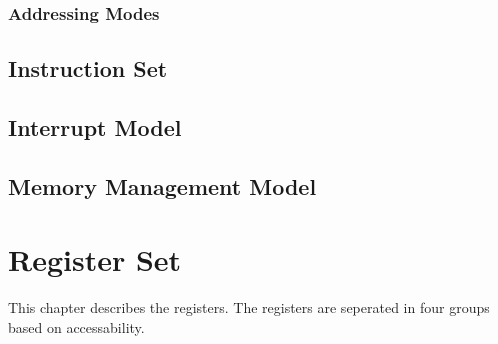 \documentclass[oneside, a4paper]{memoir}
\begin{document}
\subsection{Addressing Modes}
\section{Instruction Set}
\section{Interrupt Model}
\section{Memory Management Model}

\chapter{Register Set}
This chapter describes the registers. The registers are seperated in four groups based on accessability.
\end{document}
